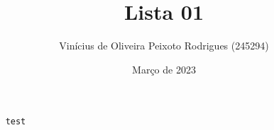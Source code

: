 \documentclass{article}
\title{Lista 01}
\author{Vinícius de Oliveira Peixoto Rodrigues (245294)}
\date{Março de 2023}
\begin{document}
\maketitle

\begin{verbatim}
    test
\end{verbatim}
\end{document}
